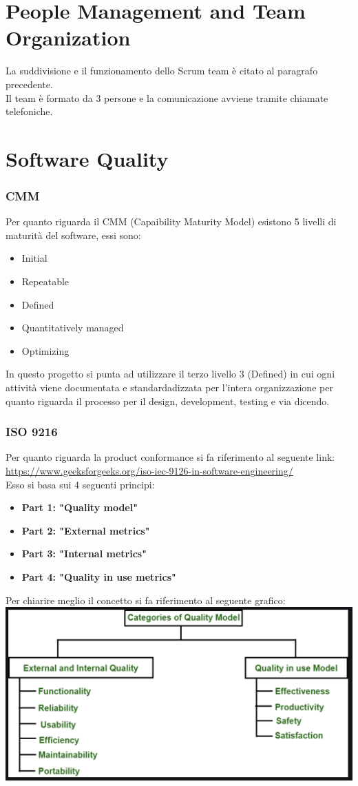 \documentclass{article}
\begin{document}
\section{People Management and Team Organization}
La suddivisione e il funzionamento dello Scrum team è citato al paragrafo precedente. 
\\Il team è formato da 3 persone e la comunicazione avviene tramite chiamate telefoniche.

\newpage
\section{Software Quality}
\subsubsection{CMM}
Per quanto riguarda il CMM (Capaibility Maturity Model) esistono 5 livelli di maturità del software, essi sono:
\begin{itemize}
    \item Initial 
    \item Repeatable
    \item Defined
    \item Quantitatively managed
    \item Optimizing
\end{itemize}
In questo progetto si punta ad utilizzare il terzo livello 3 (Defined) in cui ogni attività viene documentata
e standardadizzata per l'intera organizzazione per quanto riguarda il  processo per il design, development, testing e via dicendo.

\subsubsection{ISO 9216}
Per quanto riguarda la product conformance si fa riferimento al seguente link: \url{https://www.geeksforgeeks.org/iso-iec-9126-in-software-engineering/}
\\Esso si basa sui 4 seguenti principi:
\begin{itemize}
    \item \textbf{Part 1: "Quality model"} 
    \item \textbf{Part 2: "External metrics"} 
    \item \textbf{Part 3: "Internal metrics"} 
    \item \textbf{Part 4: "Quality in use metrics"} 
\end{itemize}
Per chiarire meglio il concetto si fa riferimento al seguente grafico:
\\\includegraphics[scale = 0.25]{"Immagini/ISO9126.PNG"}
\end{document}
